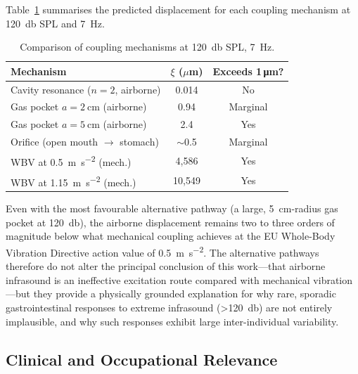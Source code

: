 Table~\ref{tab:pathway_summary} summarises the predicted displacement for
each coupling mechanism at \SI{120}{\decibel} SPL and \SI{7}{\hertz}.
\begin{table}[htbp]
  \centering
  \caption{Comparison of coupling mechanisms at \SI{120}{\decibel} SPL,
  \SI{7}{\hertz}.}
  \label{tab:pathway_summary}
  \begin{tabular}{lcc}
    \hline
    Mechanism & $\xi$ ($\mu$m) & Exceeds 1\,\si{\micro\metre}? \\
    \hline
    Cavity resonance ($n{=}2$, airborne) & 0.014 & No \\
    Gas pocket $a = \SI{2}{\centi\metre}$ (airborne) & 0.94 & Marginal \\
    Gas pocket $a = \SI{5}{\centi\metre}$ (airborne) & 2.4 & Yes \\
    Orifice (open mouth $\to$ stomach) & $\sim$0.5 & Marginal \\
    WBV at \SI{0.5}{\metre\per\second\squared} (mech.) & 4{,}586 & Yes \\
    WBV at \SI{1.15}{\metre\per\second\squared} (mech.) & 10{,}549 & Yes \\
    \hline
  \end{tabular}
\end{table}

Even with the most favourable alternative pathway (a large,
\SI{5}{\centi\metre}-radius gas pocket at \SI{120}{\decibel}), the airborne
displacement remains two to three orders of magnitude below what mechanical
coupling achieves at the EU Whole-Body Vibration Directive action value of
\SI{0.5}{\metre\per\second\squared}.  The alternative pathways therefore do
not alter the principal conclusion of this work---that airborne infrasound is
an ineffective excitation route compared with mechanical vibration---but they
provide a physically grounded explanation for why rare, sporadic
gastrointestinal responses to extreme infrasound (\SI{>120}{\decibel}) are
not entirely implausible, and why such responses exhibit large
inter-individual variability.

\subsection{Clinical and Occupational Relevance}
\label{sec:disc:clinical}

